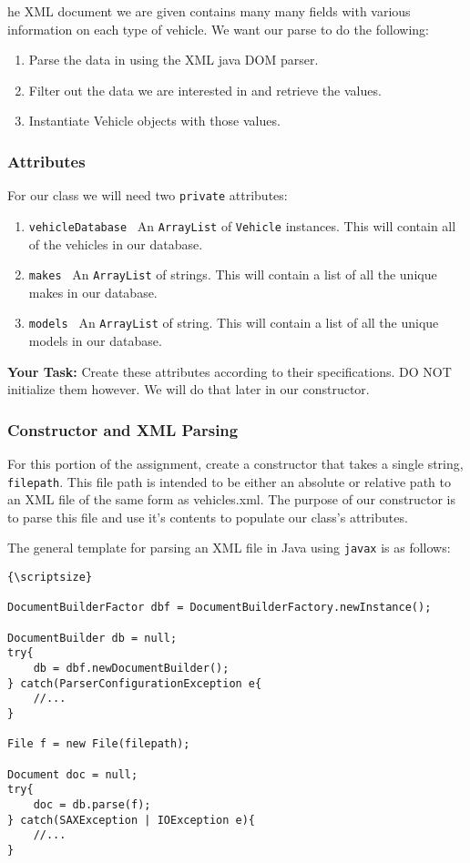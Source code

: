 he XML document we are given contains many many fields with various
information on each type of vehicle. We want our parse to do the following:
\begin{enumerate}
  \item Parse the data in using the XML java DOM parser.
  \item Filter out the data we are interested in and retrieve the values.
  \item Instantiate Vehicle objects with those values.
\end{enumerate}


\subsubsection{Attributes}

For our class we will need two \lstinline|private| attributes:
\begin{enumerate}
    \item \lstinline|vehicleDatabase|  \textrightarrow \  An \lstinline|ArrayList| of \lstinline|Vehicle| instances. This will contain all of the vehicles in our database.
    \item \lstinline|makes| \textrightarrow \ An \lstinline|ArrayList| of strings. This will contain a list of all the unique makes in our database.
    \item \lstinline|models| \textrightarrow \ An \lstinline|ArrayList| of string. This will contain a list of all the unique models in our database.
\end{enumerate}

\textbf{Your Task: } Create these attributes according to their
specifications. DO NOT initialize them however. We will do that later in our
constructor.

\subsubsection{Constructor and XML Parsing}

For this portion of the assignment, create a constructor that takes a single
string, \lstinline|filepath|. This file path is intended to be either an
absolute or relative path to an XML file of the same form as vehicles.xml. The
purpose of our constructor is to parse this file and use it's contents to
populate our class's attributes.

The general template for parsing an XML file in Java using \lstinline|javax| is as 
follows:
\begin{lstlisting}{\scriptsize}

DocumentBuilderFactor dbf = DocumentBuilderFactory.newInstance();

DocumentBuilder db = null;
try{
    db = dbf.newDocumentBuilder();
} catch(ParserConfigurationException e{
    //...
}

File f = new File(filepath);

Document doc = null;
try{
    doc = db.parse(f);
} catch(SAXException | IOException e){
    //...
}
\end{lstlisting}

